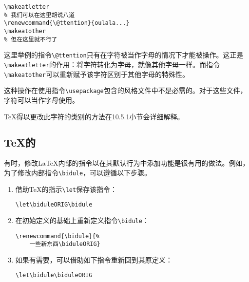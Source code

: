\begin{dmd}
\begin{verbatim}
\makeatletter
% 我们可以在这里胡说八道
\renewcommand{\@ttention}{oulala...}
\makeatother
% 但在这里就不行了
\end{verbatim}
\end{dmd}

这里举例的指令\verb+\@ttention+只有在字符被当作字母的情况下才能被操作。这正是\verb+\makeatletter+的作用：将字符转化为字母，就像其他字母一样。而指令\verb+\makeatother+可以重新赋予该字符区别于其他字母的特殊性。

\begin{exclamation}
这种操作在使用指令\verb+\usepackage+包含的风格文件中不是必需的。对于这些文件，字符可以当作字母使用。
\end{exclamation}

\TeX 得以更改此字符的类别的方法在10.5.1小节会详细解释。

\subsection{\TeX 的}

有时，修改\LaTeX 内部的指令以在其默认行为中添加功能是很有用的做法。例如，为了修改内部指令\verb+\bidule+，可以遵循以下步骤。

\begin{enumerate}
    \item 借助\TeX 的指示\verb+\let+保存该指令：
    
    \begin{dmd}
    \verb|\let\biduleORIG\bidule|
    \end{dmd}

    \item 在初始定义的基础上重新定义指令\verb+\bidule+：
    
    \begin{dmd}
    \begin{verbatim}
\renewcommand{\bidule}{%
    一些新东西\biduleORIG}
    \end{verbatim}
    \end{dmd}

    \item 如果有需要，可以借助如下指令重新回到其原定义：
    
    \begin{dmd}
    \verb+\let\bidule\biduleORIG+
    \end{dmd}
\end{enumerate}

